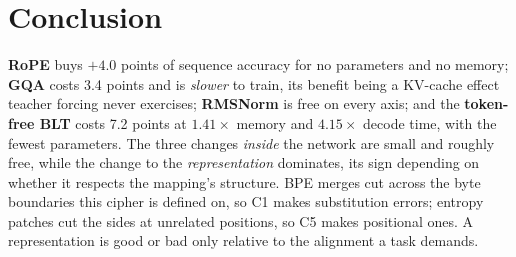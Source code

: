 \section{Conclusion}

\textbf{RoPE} buys $+4.0$ points of sequence accuracy for no parameters and no
memory; \textbf{GQA} costs 3.4 points and is \emph{slower} to train, its benefit
being a KV-cache effect teacher forcing never exercises; \textbf{RMSNorm} is free
on every axis; and the \textbf{token-free BLT} costs 7.2 points at $1.41\times$
memory and $4.15\times$ decode time, with the fewest parameters. 
The three changes \emph{inside} the network are small and roughly free, while the
change to the \emph{representation} dominates, its sign depending on whether it
respects the mapping's structure. BPE merges cut across the byte boundaries this
cipher is defined on, so C1 makes substitution errors; entropy patches cut the
sides at unrelated positions, so C5 makes positional ones. A representation is
good or bad only relative to the alignment a task demands.
